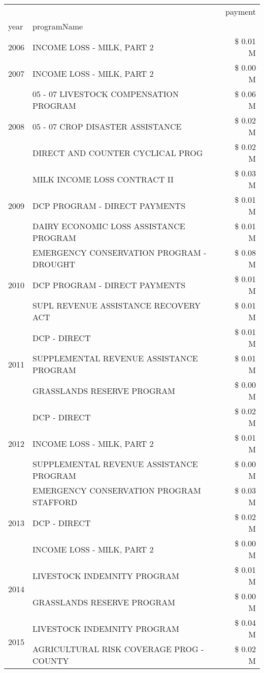\begin{tabular}{llr}
\toprule
 &  & payment \\
year & programName &  \\
\midrule
2006 & INCOME LOSS - MILK, PART 2 & \$ 0.01 M \\
\cline{1-3}
2007 & INCOME LOSS - MILK, PART 2 & \$ 0.00 M \\
\cline{1-3}
\multirow[t]{3}{*}{2008} & 05 - 07 LIVESTOCK COMPENSATION PROGRAM & \$ 0.06 M \\
 & 05 - 07 CROP DISASTER ASSISTANCE & \$ 0.02 M \\
 & DIRECT AND COUNTER CYCLICAL PROG & \$ 0.02 M \\
\cline{1-3}
\multirow[t]{3}{*}{2009} & MILK INCOME LOSS CONTRACT II & \$ 0.03 M \\
 & DCP PROGRAM - DIRECT PAYMENTS & \$ 0.01 M \\
 & DAIRY ECONOMIC LOSS ASSISTANCE PROGRAM & \$ 0.01 M \\
\cline{1-3}
\multirow[t]{3}{*}{2010} & EMERGENCY CONSERVATION PROGRAM - DROUGHT & \$ 0.08 M \\
 & DCP PROGRAM - DIRECT PAYMENTS & \$ 0.01 M \\
 & SUPL REVENUE ASSISTANCE RECOVERY ACT & \$ 0.01 M \\
\cline{1-3}
\multirow[t]{3}{*}{2011} & DCP - DIRECT & \$ 0.01 M \\
 & SUPPLEMENTAL REVENUE ASSISTANCE PROGRAM & \$ 0.01 M \\
 & GRASSLANDS RESERVE PROGRAM & \$ 0.00 M \\
\cline{1-3}
\multirow[t]{3}{*}{2012} & DCP - DIRECT & \$ 0.02 M \\
 & INCOME LOSS - MILK, PART 2 & \$ 0.01 M \\
 & SUPPLEMENTAL REVENUE ASSISTANCE PROGRAM & \$ 0.00 M \\
\cline{1-3}
\multirow[t]{3}{*}{2013} & EMERGENCY CONSERVATION PROGRAM STAFFORD & \$ 0.03 M \\
 & DCP - DIRECT & \$ 0.02 M \\
 & INCOME LOSS - MILK, PART 2 & \$ 0.00 M \\
\cline{1-3}
\multirow[t]{2}{*}{2014} & LIVESTOCK INDEMNITY PROGRAM & \$ 0.01 M \\
 & GRASSLANDS RESERVE PROGRAM & \$ 0.00 M \\
\cline{1-3}
\multirow[t]{3}{*}{2015} & LIVESTOCK INDEMNITY PROGRAM & \$ 0.04 M \\
 & AGRICULTURAL RISK COVERAGE PROG - COUNTY & \$ 0.02 M \\

\end{tabular}
